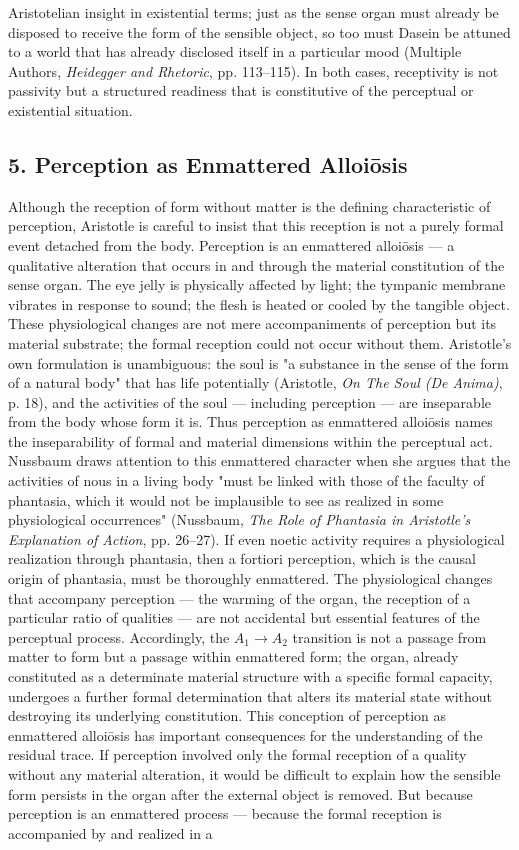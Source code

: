Aristotelian insight in existential terms; just as the sense organ must already be disposed to receive the form of the sensible object, so too must Dasein be attuned to a world that has already disclosed itself in a particular mood (Multiple Authors, \textit{Heidegger and Rhetoric}, pp. 113--115). In both cases, receptivity is not passivity but a structured readiness that is constitutive of the perceptual or existential situation. 

\subsection*{5. Perception as Enmattered Alloiōsis}

Although the reception of form without matter is the defining characteristic of perception, Aristotle is careful to insist that this reception is not a purely formal event detached from the body. Perception is an enmattered alloiōsis --- a qualitative alteration that occurs in and through the material constitution of the sense organ. The eye jelly is physically affected by light; the tympanic membrane vibrates in response to sound; the flesh is heated or cooled by the tangible object. These physiological changes are not mere accompaniments of perception but its material substrate; the formal reception could not occur without them. Aristotle's own formulation is unambiguous: the soul is "a substance in the sense of the form of a natural body" that has life potentially (Aristotle, \textit{On The Soul (De Anima)}, p. 18), and the activities of the soul --- including perception --- are inseparable from the body whose form it is. Thus perception as enmattered alloiōsis names the inseparability of formal and material dimensions within the perceptual act. Nussbaum draws attention to this enmattered character when she argues that the activities of nous in a living body "must be linked with those of the faculty of phantasia, which it would not be implausible to see as realized in some physiological occurrences" (Nussbaum, \textit{The Role of Phantasia in Aristotle's Explanation of Action}, pp. 26--27). If even noetic activity requires a physiological realization through phantasia, then a fortiori perception, which is the causal origin of phantasia, must be thoroughly enmattered. The physiological changes that accompany perception --- the warming of the organ, the reception of a particular ratio of qualities --- are not accidental but essential features of the perceptual process. Accordingly, the $A_1$$\to$$A_2$ transition is not a passage from matter to form but a passage within enmattered form; the organ, already constituted as a determinate material structure with a specific formal capacity, undergoes a further formal determination that alters its material state without destroying its underlying constitution. This conception of perception as enmattered alloiōsis has important consequences for the understanding of the residual trace. If perception involved only the formal reception of a quality without any material alteration, it would be difficult to explain how the sensible form persists in the organ after the external object is removed. But because perception is an enmattered process --- because the formal reception is accompanied by and realized in a 